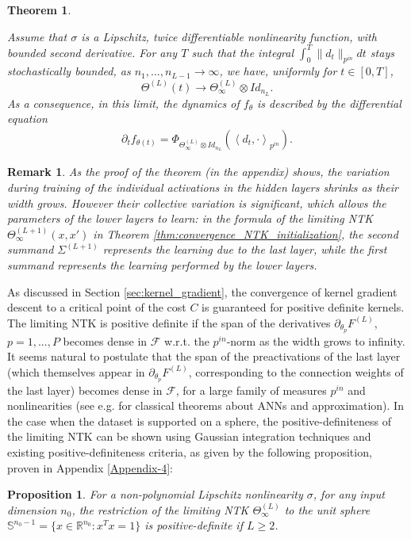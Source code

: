 \documentclass{article}
\newtheorem{prop}{Proposition}
\newtheorem{thm}{Theorem}
\newtheorem{rem}{Remark}
\begin{document}
\begin{thm}\label{thm:conv-ntk-training}

Assume that $ \sigma $ is a Lipschitz, twice differentiable nonlinearity function, with bounded second derivative. For any $T$ such that the integral $\int_0^T \| d_t \|_{p^{in}} dt$ stays stochastically bounded, as  $n_1, ..., n_{L-1} \to \infty$, we have, uniformly for $t\in[0, T]$,
$$
\Theta^{(L)}(t) \to \Theta^{(L)}_\infty \otimes Id_{n_L}.
$$
As a consequence, in this limit, the dynamics of $f_\theta$ is described by the differential equation
\begin{align*}
    \partial_t f_{\theta(t)} = \Phi_{\Theta^{(L)}_\infty \otimes Id_{n_L}} \left( \left<d_{t}, \cdot \right>_{p^{in}} \right).
\end{align*}
\end{thm}



\begin{rem}
As the proof of the theorem (in the appendix) shows, the variation during training of the individual activations in the hidden layers shrinks as their width grows. However their collective variation is significant, which allows the parameters of the lower layers to learn: in the formula of the limiting NTK  $\Theta^{(L+1)}_\infty(x, x')$ in Theorem \ref{thm:convergence_NTK_initialization}, the second summand $\Sigma^{(L+1)}$ represents the learning due to the last layer, while the first summand represents the learning performed by the lower layers. 
\end{rem}

As discussed in Section \ref{sec:kernel_gradient}, the convergence of kernel gradient descent to a critical point of the cost $C$ is guaranteed for positive definite kernels. The limiting NTK is positive definite if the span of the derivatives $\partial_{\theta_p} F^{(L)}$, $p=1, ..., P$ becomes dense in $\mathcal{F}$ w.r.t. the $p^{in}$-norm as the width grows to infinity. It seems natural to postulate that the span of the preactivations of the last layer (which themselves appear in $\partial_{\theta_p} F^{(L)}$, corresponding to the connection weights of the last layer) becomes dense in $\mathcal{F}$, for a large family of measures $ p^{in}$ and nonlinearities (see e.g. \cite{Hornik1989, Leshno} for classical theorems about ANNs and approximation). In the case when the dataset is supported on a sphere, the positive-definiteness of the limiting NTK can be shown using Gaussian integration techniques and existing positive-definiteness criteria, as given by the following proposition, proven in Appendix \ref{Appendix-4}:
\begin{prop}\label{prop:pos-def}
	 For a non-polynomial Lipschitz nonlinearity $ \sigma $, for any input dimension $ n_0 $, the restriction of the limiting NTK $ \Theta_\infty^{(L)} $ to the unit sphere $ \mathbb{S}^{n_0 - 1} = \{ x \in \mathbb{R}^{n_0} : x^T x =1 \} $ is positive-definite if $ L \geq 2 $. 
\end{prop}
\end{document}
